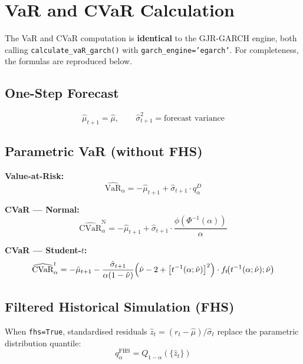 \documentclass[11pt, a4paper]{article}
\begin{document}
\section{VaR and CVaR Calculation}

The VaR and CVaR computation is \textbf{identical} to the GJR-GARCH engine,
both calling \texttt{calculate\_vaR\_garch()} with \texttt{garch\_engine='egarch'}.
For completeness, the formulas are reproduced below.

\subsection{One-Step Forecast}

\begin{equation}
\hat{\mu}_{t+1} = \hat{\mu}, \qquad \hat{\sigma}_{t+1}^2 = \text{forecast variance}
\end{equation}

\subsection{Parametric VaR (without FHS)}

\textbf{Value-at-Risk:}
\begin{equation}
\widehat{\text{VaR}}_\alpha
= -\hat{\mu}_{t+1} + \hat{\sigma}_{t+1} \cdot q_\alpha^D
\end{equation}

\textbf{CVaR --- Normal:}
\begin{equation}
\widehat{\text{CVaR}}_\alpha^{\text{N}}
= -\hat{\mu}_{t+1} + \hat{\sigma}_{t+1} \cdot
  \frac{\phi\!\left(\Phi^{-1}(\alpha)\right)}{\alpha}
\end{equation}

\textbf{CVaR --- Student-$t$:}
\begin{equation}
\widehat{\text{CVaR}}_\alpha^{t}
= -\hat{\mu}_{t+1}
  - \frac{\hat{\sigma}_{t+1}}{\alpha(1 - \hat{\nu})}
    \Bigl(\hat{\nu} - 2 + \bigl[t^{-1}(\alpha;\hat{\nu})\bigr]^2\Bigr)
    \cdot f_t\!\bigl(t^{-1}(\alpha;\hat{\nu});\hat{\nu}\bigr)
\end{equation}

\subsection{Filtered Historical Simulation (FHS)}

When \texttt{fhs=True}, standardised residuals
$\hat{z}_t = (r_t - \hat{\mu})/\hat{\sigma}_t$ replace the parametric
distribution quantile:
\begin{equation}
q_\alpha^{\text{FHS}} = Q_{1-\alpha}\!\left(\{\hat{z}_t\}\right)
\end{equation}
\end{document}
